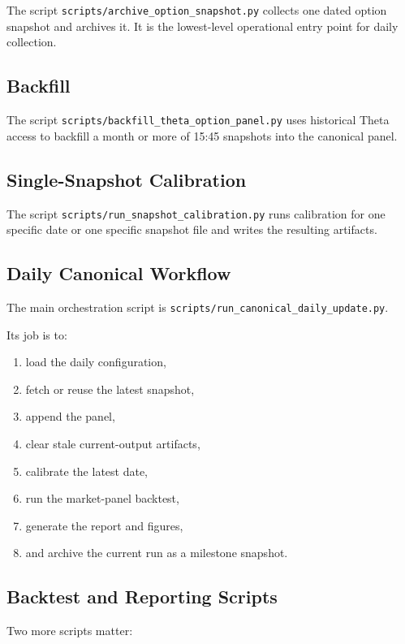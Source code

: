 \documentclass[11pt]{article}
\begin{document}
The script
\texttt{scripts/archive\_option\_snapshot.py}
collects one dated option snapshot and archives it. It is the lowest-level operational entry point for daily collection.

\subsection{Backfill}

The script
\texttt{scripts/backfill\_theta\_option\_panel.py}
uses historical Theta access to backfill a month or more of 15:45 snapshots into the canonical panel.

\subsection{Single-Snapshot Calibration}

The script
\texttt{scripts/run\_snapshot\_calibration.py}
runs calibration for one specific date or one specific snapshot file and writes the resulting artifacts.

\subsection{Daily Canonical Workflow}

The main orchestration script is
\texttt{scripts/run\_canonical\_daily\_update.py}.

Its job is to:

\begin{enumerate}
  \item load the daily configuration,
  \item fetch or reuse the latest snapshot,
  \item append the panel,
  \item clear stale current-output artifacts,
  \item calibrate the latest date,
  \item run the market-panel backtest,
  \item generate the report and figures,
  \item and archive the current run as a milestone snapshot.
\end{enumerate}

\subsection{Backtest and Reporting Scripts}

Two more scripts matter:
\end{document}

